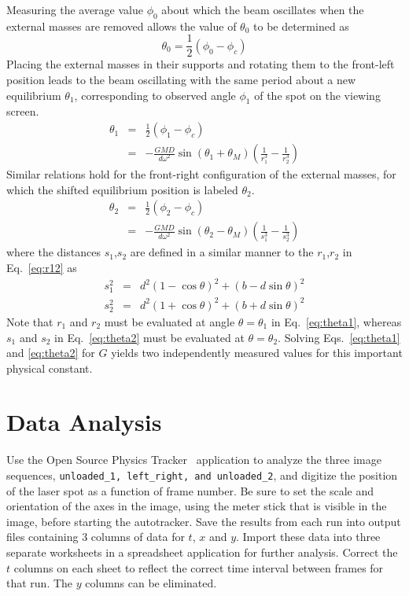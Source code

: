 \documentclass{revtex4}
\begin{document}
Measuring the average value $\phi_0$ about which the beam oscillates when the
external masses are removed allows the value of $\theta_0$ to be 
determined as
\begin{equation}
\theta_0=\frac{1}{2}(\phi_0-\phi_c)
\end{equation}
Placing the external masses in their supports and rotating them to the
front-left position leads to the beam oscillating with the same period about
a new equilibrium $\theta_1$, corresponding to observed angle $\phi_1$ of
the spot on the viewing screen.
\begin{eqnarray}
\theta_1 &=& \frac{1}{2}(\phi_1-\phi_c)
\nonumber\\
&=& -\frac{GMD}{d\omega^2}\sin(\theta_1+\theta_M)
\left(\frac{1}{r_1^3}-\frac{1}{r_2^3}\right)
\label{eq:theta1}
\end{eqnarray}
Similar relations hold for the front-right configuration of the external
masses, for which the shifted equilibrium position is labeled $\theta_2$.
\begin{eqnarray}
\theta_2 &=& \frac{1}{2}(\phi_2-\phi_c)
\nonumber\\
&=& -\frac{GMD}{d\omega^2}\sin(\theta_2-\theta_M)
\left(\frac{1}{s_1^3}-\frac{1}{s_2^3}\right)
\label{eq:theta2}
\end{eqnarray}
where the distances $s_1$,$s_2$ are defined in a similar manner to the
$r_1$,$r_2$ in Eq.~\ref{eq:r12} as
\begin{eqnarray}
s_1^2 &=& d^2(1-\cos\theta)^2 + (b-d\sin\theta)^2
\nonumber\\
s_2^2 &=& d^2(1+\cos\theta)^2 + (b+d\sin\theta)^2
\end{eqnarray}
Note that $r_1$ and $r_2$ must be evaluated at angle $\theta=\theta_1$ in 
Eq.~\ref{eq:theta1}, whereas $s_1$ and $s_2$ in Eq.~\ref{eq:theta2}
must be evaluated at $\theta=\theta_2$.  
Solving Eqs.~\ref{eq:theta1} and \ref{eq:theta2} for $G$
yields two independently measured values for this important physical constant.

\section{Data Analysis}

Use the Open Source Physics Tracker~\cite{tracker} application to analyze
the three image sequences, {\tt unloaded\_1, left\_right, and unloaded\_2},
and digitize the position of the laser spot as a function of frame number.
Be sure to set the scale and orientation of the axes in the image, using
the meter stick that is visible in the image, before starting the
autotracker.  Save the results from each run into output files containing
3 columns of data for $t$, $x$ and $y$.  Import these data into three
separate worksheets in a spreadsheet application for further analysis.
Correct the $t$ columns on each sheet to reflect the correct time interval
between frames for that run.  The $y$ columns can be eliminated.
\end{document}
